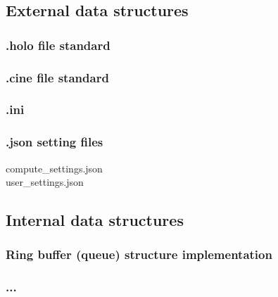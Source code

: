 \subsection{External data structures}


\subsubsection{.holo file standard}
\subsubsection{.cine file standard}
\subsubsection{.ini}
\subsubsection{.json setting files}
compute\_settings.json\\
user\_settings.json

\subsection{Internal data structures}

\subsubsection{Ring buffer (queue) structure implementation}
\subsubsection{...}

